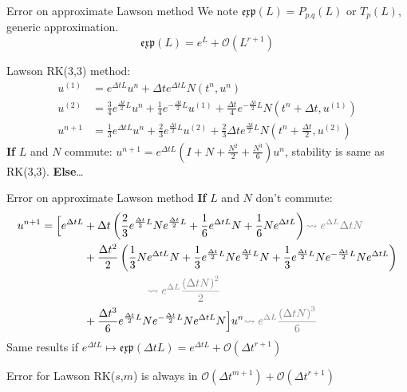 \documentclass{beamer}
\newcommand{\mbold}[1]{{\textbf{\color{PLB}#1}}}
\begin{document}
\begin{frame}{Error on approximate Lawson method}
  We note $\mathfrak{exp}(L) = P_{p.q}(L)$ or $T_p(L)$, generic approximation.
  $$\mathfrak{exp}(L) = e^L + \mathcal{O}(L^{r+1})$$

  Lawson RK(3,3) method:
  $$
    \begin{aligned}
      u^{(1)} &= e^{\Delta t L}u^n + \Delta te^{\Delta t L}N(t^n,u^n) \\
      u^{(2)} &= \frac{3}{4}e^{\frac{\Delta t}{2} L}u^n + \frac{1}{4}e^{-\frac{\Delta t}{2} L}u^{(1)} + \frac{\Delta t}{4}e^{-\frac{\Delta t}{2} L} N(t^n+\Delta t,u^{(1)}) \\
      u^{n+1} &= \frac{1}{3}e^{\Delta t L}u^n + \frac{2}{3}e^{\frac{\Delta t}{2} L}u^{(2)} + \frac{2}{3}\Delta t e^{\frac{\Delta t}{2} L} N(t^n+\frac{\Delta t}{2},u^{(2)})
    \end{aligned}
  $$
  \mbold{If} $L$ and $N$ commute: $u^{n+1} = e^{\Delta tL}\left(I + N + \frac{N^2}{2} + \frac{N^3}{6} \right)u^n$, stability is same as RK(3,3). \mbold{Else}\dots
\end{frame}
\begin{frame}{Error on approximate Lawson method}
  \mbold{If} $L$ and $N$ don't commute:
  $$
    \begin{aligned}
      u^{n+1} = \Big[ e^{\Delta tL}
        &+\Delta t\left(\frac{2}{3}e^{\frac{\Delta t}{2}L}Ne^{\frac{\Delta t}{2}L}+\frac{1}{6}e^{\Delta tL}N + \frac{1}{6}Ne^{\Delta tL}\right)
          \textcolor{gris}{\rightsquigarrow e^{\Delta L}\Delta t N} \\
        & + \frac{\Delta t^2}{2}\left(\frac{1}{3}Ne^{\Delta tL}N + \frac{1}{3}e^{\frac{\Delta t}{2}L}Ne^{\frac{\Delta t}{2}L}N + \frac{1}{3} e^{\frac{\Delta t}{2}L}Ne^{-\frac{\Delta t}{2}L}Ne^{\Delta tL} \right) \\
          &\hspace{2cm} \textcolor{gris}{\rightsquigarrow e^{\Delta L}\frac{\left(\Delta t N\right)^2}{2}} \\
      & + \frac{\Delta t^3}{6}e^{\frac{\Delta t}{2}L}Ne^{-\frac{\Delta t}{2}L}Ne^{\Delta tL}N \Big]u^n \textcolor{gris}{\rightsquigarrow e^{\Delta L}\frac{\left(\Delta t N\right)^3}{6}}
    \end{aligned}
  $$
  Same results if $e^{\Delta t L}\mapsto \mathfrak{exp}(\Delta t L) = e^{\Delta t L} + \mathcal{O}(\Delta t^{r+1})$

  \begin{lemma}
    Error for Lawson RK($s$,$m$) is always in $\mathcal{O}(\Delta t^{m+1})+\mathcal{O}(\Delta t^{r+1})$
  \end{lemma}
\end{frame}
\end{document}
